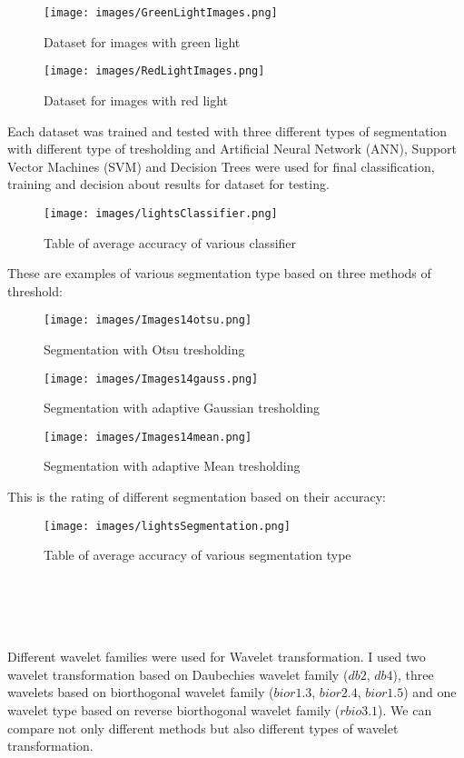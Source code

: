\documentclass{article}
\begin{document}
\begin{figure}[htbp]
    \centering
    \texttt{[image: images/GreenLightImages.png]}
    \caption{Dataset for images with green light}
\end{figure}

\begin{figure}[htbp]
    \centering
    \texttt{[image: images/RedLightImages.png]}
    \caption{Dataset for images with red light}
\end{figure}

Each dataset was trained and tested with three different types of segmentation with different type of tresholding and Artificial Neural Network (ANN), Support Vector Machines (SVM) and Decision Trees were used for final classification, training and decision about results for dataset for testing.

\begin{figure}[!htbp]
    \centering
    \texttt{[image: images/lightsClassifier.png]}
    \caption{Table of average accuracy of various classifier }
\end{figure}

These are examples of various segmentation type based on three methods of threshold:\\
\begin{figure}[!htbp]
  \begin{minipage}[b]{0.3\linewidth}
    \centering
    \texttt{[image: images/Images14otsu.png]}
    \caption{Segmentation with Otsu tresholding}
  \end{minipage}
  \hspace{0.3cm}
  \begin{minipage}[b]{0.3\linewidth}
    \centering
    \texttt{[image: images/Images14gauss.png]}
    \caption{Segmentation with adaptive Gaussian tresholding}
  \end{minipage}
  \hspace{0.3cm}
    \begin{minipage}[b]{0.3\linewidth}
    \centering
    \texttt{[image: images/Images14mean.png]}
    \caption{Segmentation with adaptive Mean tresholding}
  \end{minipage}
\end{figure}

This is the rating of different segmentation based on their accuracy:
\begin{figure}[!htbp]
    \centering
    \texttt{[image: images/lightsSegmentation.png]}
    \caption{Table of average accuracy of various segmentation type}
\end{figure}
\\\\\\\\
Different wavelet families were used for Wavelet transformation. I used two wavelet transformation based on Daubechies wavelet family ($db2$, $db4$), three wavelets based on biorthogonal wavelet family ($bior1.3$, $bior2.4$, $bior1.5$) and one wavelet type based on reverse biorthogonal wavelet family ($rbio3.1$). We can compare not only different methods but also different types of wavelet transformation.
\end{document}
